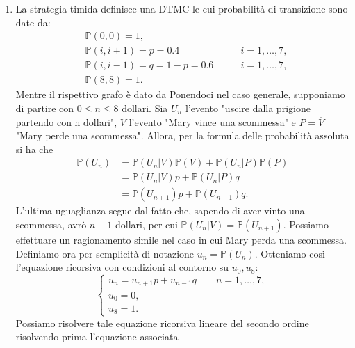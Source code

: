 \documentclass[
	12pt, %
]{fphw}
\begin{document}
\begin{enumerate}
	\item La strategia timida definisce una DTMC le cui probabilità di transizione sono date da:
		\begin{equation*}
			\begin{aligned}
				&\mathbb{P}(0, 0) = 1,	\\
				&\mathbb{P}(i, i+1) = p = 0.4	\qquad &i = 1, \dots, 7,	\\
				&\mathbb{P}(i, i-1) = q = 1-p = 0.6	\qquad &i = 1, \dots, 7,	\\
				&\mathbb{P}(8, 8) = 1.
			\end{aligned}
		\end{equation*}
		Mentre il rispettivo grafo è dato da
		Ponendoci nel caso generale, supponiamo di partire con $0 \leq n \leq 8$ dollari.
		Sia $U_n$ l'evento "uscire dalla prigione partendo con n dollari", $V$ l'evento "Mary vince una scommessa" e $P = \overline{V}$ "Mary perde una scommessa".
		Allora, per la formula delle probabilità assoluta si ha che
		\begin{equation} \label{eq:es3_1}
			\begin{aligned}
				\mathbb{P}(U_n) &= \mathbb{P}(U_n | V)\mathbb{P}(V) + \mathbb{P}(U_n | P)\mathbb{P}(P) \\
					&= \mathbb{P}(U_n | V)p + \mathbb{P}(U_n | P)q \\
					&= \mathbb{P}(U_{n+1})p + \mathbb{P}(U_{n-1}) q.
			\end{aligned}
		\end{equation}
		L'ultima uguaglianza segue dal fatto che, sapendo di aver vinto una scommessa, avrò $n+1$ dollari, per cui $\mathbb{P}(U_n | V) = \mathbb{P}(U_{n+1})$.
		Possiamo effettuare un ragionamento simile nel caso in cui Mary perda una scommessa.
		Definiamo ora per semplicità di notazione $u_n = \mathbb{P}(U_n)$.
		Otteniamo così l'equazione ricorsiva con condizioni al contorno su $u_0, u_8$:
		\begin{equation*}
			\begin{cases}
				u_n = u_{n+1}p + u_{n-1}q \qquad n = 1, \dots, 7, \\
				u_0 = 0, \\
				u_8 = 1.
			\end{cases}
		\end{equation*}
		Possiamo risolvere tale equazione ricorsiva lineare del secondo ordine risolvendo prima l'equazione associata
		\begin{equation*}

\end{equation*}
\end{enumerate}
\end{document}
